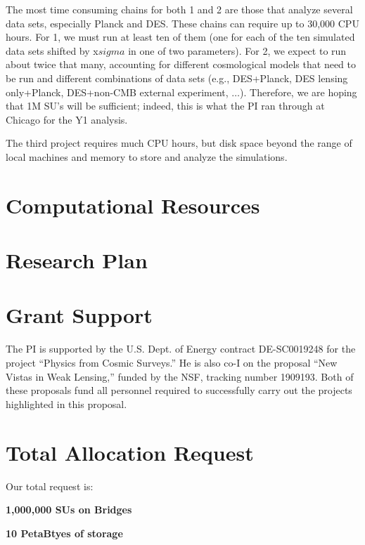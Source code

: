 \documentclass[12pt]{article}
\begin{document}
\begin{small}
The most time consuming chains for both 1 and 2 are those that analyze several data sets, especially Planck and DES. These chains can require up to 30,000 CPU hours. For 1, we must run at least ten of them (one for each of the ten simulated data sets shifted by x$sigma$ in one of two parameters). For 2, we expect to run about twice that many, accounting for different cosmological models that need to be run and different combinations of data sets (e.g., DES+Planck, DES lensing only+Planck, DES+non-CMB external experiment, $\ldots$). Therefore, we are hoping that 1M SU's will be sufficient; indeed, this is what the PI ran through at Chicago for the Y1 analysis.

The third project requires much CPU hours, but disk space beyond the range of local machines and memory to store and analyze the simulations.


\section{Computational Resources}

\section{Research Plan}

\section{Grant Support}

The PI is supported by the U.S. Dept. of Energy contract DE-SC0019248 for the project ``Physics from Cosmic Surveys.'' He is also co-I on the proposal ``New Vistas in Weak Lensing,'' funded by the NSF, tracking number 1909193. Both of these proposals fund all personnel required to successfully carry out the projects highlighted in this proposal.

\section{Total Allocation Request}

Our total request is:

{\bf 1,000,000 SUs on Bridges}

{\bf 10 PetaBtyes of storage}

\end{small}




\end{document}

